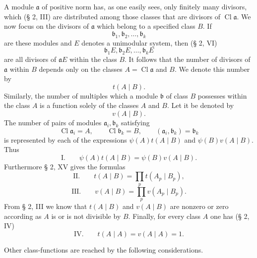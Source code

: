 \documentclass[11pt,a4paper]{article}
\newcommand{\Cl}{\operatorname{Cl}}
\begin{document}
A module $\mathfrak a$ of positive norm has, as one easily sees, only finitely many divisors, which (§ 2, III) are distributed among those classes that are divisors of $\Cl\mathfrak a$. We now focus on the divisors of $\mathfrak a$ which belong to a specified class $B$. If
\[
 \mathfrak b_1,\mathfrak b_2,\ldots,\mathfrak b_k
\]
are these modules and $E$ denotes a unimodular system, then (§ 2, VI)
\[
 \mathfrak b_1E,\mathfrak b_2E,\ldots,\mathfrak b_kE
\]
are all divisors of $\mathfrak aE$ within the class $B$. It follows that the number of divisors of $\mathfrak a$ within $B$ depends only on the classes $A=\Cl\mathfrak a$ and $B$. We denote this number by
\[
 t(A\mid B).
\]
Similarly, the number of multiples which a module $\mathfrak b$ of class $B$ possesses within the class $A$ is a function solely of the classes $A$ and $B$. Let it be denoted by
\[
 v(A\mid B).
\]
The number of pairs of modules $\mathfrak a_i,\mathfrak b_k$ satisfying
\[
 \Cl\mathfrak a_i=A,
 \qquad
 \Cl\mathfrak b_k=B,
 \qquad
 (\mathfrak a_i,\mathfrak b_k)=\mathfrak b_k
\]
is represented by each of the expressions $\psi(A)t(A\mid B)$ and $\psi(B)v(A\mid B)$. Thus
\[
\text{I.}\qquad
 \psi(A)t(A\mid B)=\psi(B)v(A\mid B).
\]
Furthermore § 2, XV gives the formulas
\[
\text{II.}\qquad t(A\mid B)=\prod_p t(A_p\mid B_p),
\]
\[
\text{III.}\qquad v(A\mid B)=\prod_p v(A_p\mid B_p).
\]
From § 2, III we know that $t(A\mid B)$ and $v(A\mid B)$ are nonzero or zero according as $A$ is or is not divisible by $B$. Finally, for every class $A$ one has (§ 2, IV)
\[
\text{IV.}\qquad t(A\mid A)=v(A\mid A)=1.
\]

Other class-functions are reached by the following considerations.
\end{document}
